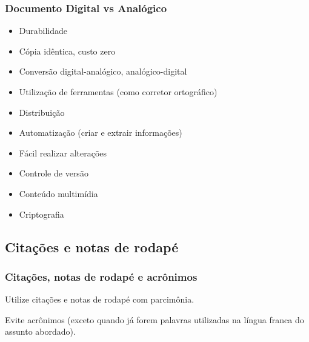 \documentclass[10pt,notes,compress,aspectratio=169]{beamer}
\begin{document}
\begin{frame}
\frametitle{Documento Digital vs Analógico}

\begin{itemize}[<+->]
\item Durabilidade
\item Cópia idêntica, custo zero
\item Conversão digital-analógico, analógico-digital
\item Utilização de ferramentas (como corretor ortográfico)
\item Distribuição
\item Automatização (criar e extrair informações)
\item Fácil realizar alterações
\item Controle de versão
\item Conteúdo multimídia
\item Criptografia  
\end{itemize}

\end{frame}













\subsection{Citações e notas de rodapé}
\begin{frame}
\frametitle{Citações, notas de rodapé e acrônimos}
Utilize citações e notas de rodapé com parcimônia.

\vspace{3ex}
Evite acrônimos (exceto quando já forem palavras utilizadas na língua franca do assunto abordado).
\end{frame}
















\end{document}
